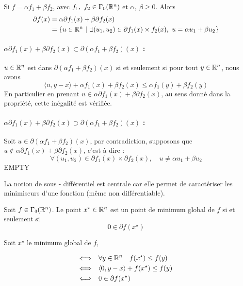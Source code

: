 \documentclass[a4paper,12pt]{article}
\begin{document}
\begin{propriete}
Si $f = \alpha f_1+\beta f_2$, avec $f_1,\ f_2\in\Gamma_0(\mathbb{R}^n)$ et $\alpha,\ \beta \geq 0$. Alors 
\begin{align*}
\partial f(x) &= \alpha \partial f_1(x) + \beta \partial f_2(x) \\
&= \left\{u\in\mathbb{R}^n\ |\ \exists (u_1,u_2)\in \partial f_1(x)\times f_2(x),\ u = \alpha u_1 + \beta u_2 \right\}
\end{align*}
\end{propriete}
\begin{preuve}
\vspace{-1cm}
\paragraph{$\alpha\partial f_1(x) +\beta \partial f_2(x) \subset
\partial (\alpha f_1 +\beta f_2)(x)$ :}$u\in\mathbb{R}^n$ est dans $\partial (\alpha f_1 +\beta f_2)(x)$ si et seulement si pour tout $y\in \mathbb{R}^n$, nous avons 
$$
\langle u,y-x\rangle + \alpha f_1(x) +\beta f_2(x) \leq  \alpha f_1(y) +\beta f_2(y) 
$$
En particulier en prenant $u\in \alpha\partial f_1(x) +\beta \partial f_2(x) $, au sens donné dans la propriété, cette inégalité est vérifiée. 

\paragraph{$\alpha\partial f_1(x) +\beta \partial f_2(x) \supset
\partial (\alpha f_1 +\beta f_2)(x)$ :}Soit $u\in\partial (\alpha f_1 +\beta f_2)(x)$, par contradiction, supposons que  $u\notin \alpha\partial f_1(x) +\beta \partial f_2(x)$, c'est à dire : 
$$
\forall (u_1,u_2)\in \partial f_1(x) \times \partial f_2(x),\quad u\neq \alpha u_1+\beta u_2
$$
{\Huge EMPTY}
\end{preuve}

La notion de sous - différentiel est centrale car elle permet de caractériser les minimiseurs d'une fonction (même non différentiable).
\begin{theoreme}{}
Soit $f\in\Gamma_0(\mathbb{R}^n)$. Le point $x^{\star}\in\mathbb{R}^n$ est un point de minimum global de $f$ si et seulement si 
$$
0\in \partial f(x^{\star})
$$ 
\end{theoreme}
\begin{preuve}
\vspace{-1cm}
Soit $x^{\star}$ le minimum global de $f$, 

\begin{align*}
\Longleftrightarrow \quad & \forall y\in\mathbb{R}^n\quad  f(x^{\star})                        \leq f(y)\\
\Longleftrightarrow \quad &                  \langle 0,y-x\rangle +f(x^{\star})  \leq f(y)\\
\Longleftrightarrow \quad &                   0\in \partial f(x^{\star})       
\end{align*}

\end{preuve}
\end{document}
